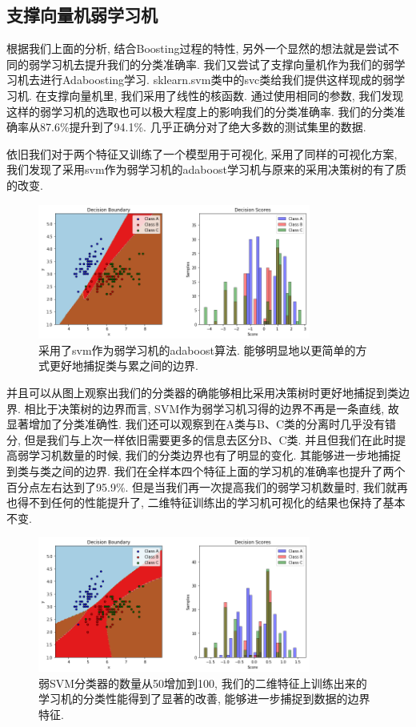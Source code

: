 \documentclass[lang=cn,11pt]{elegantpaper}
\begin{document}
\subsection{支撑向量机弱学习机}

根据我们上面的分析, 结合Boosting过程的特性, 另外一个显然的想法就是尝试不同的弱学习机去提升我们的分类准确率. 我们又尝试了支撑向量机作为我们的弱学习机去进行Adaboosting学习. sklearn.svm类中的svc类给我们提供这样现成的弱学习机. 在支撑向量机里, 我们采用了线性的核函数. 通过使用相同的参数, 我们发现这样的弱学习机的选取也可以极大程度上的影响我们的分类准确率. 我们的分类准确率从87.6\%提升到了94.1\%. 几乎正确分对了绝大多数的测试集里的数据.

依旧我们对于两个特征又训练了一个模型用于可视化, 采用了同样的可视化方案, 我们发现了采用svm作为弱学习机的adaboost学习机与原来的采用决策树的有了质的改变.

\begin{figure}[hbt]	
\centering
  \includegraphics[width=0.8\textwidth]{svm50}
  \caption{采用了svm作为弱学习机的adaboost算法. 能够明显地以更简单的方式更好地捕捉类与累之间的边界.}
\end{figure}


并且可以从图上观察出我们的分类器的确能够相比采用决策树时更好地捕捉到类边界. 相比于决策树的边界而言, SVM作为弱学习机习得的边界不再是一条直线, 故显著增加了分类准确性. 我们还可以观察到在A类与B、C类的分离时几乎没有错分, 但是我们与上次一样依旧需要更多的信息去区分B、C类. 并且但我们在此时提高弱学习机数量的时候, 我们的分类边界也有了明显的变化. 其能够进一步地捕捉到类与类之间的边界. 我们在全样本四个特征上面的学习机的准确率也提升了两个百分点左右达到了95.9\%. 但是当我们再一次提高我们的弱学习机数量时, 我们就再也得不到任何的性能提升了, 二维特征训练出的学习机可视化的结果也保持了基本不变.

\begin{figure}[hbt]
  \includegraphics[width=0.8\textwidth]{svm100}
  \caption{弱SVM分类器的数量从50增加到100, 我们的二维特征上训练出来的学习机的分类性能得到了显著的改善, 能够进一步捕捉到数据的边界特征.}
\end{figure}



\newpage
\nocite{*}



\end{document}
